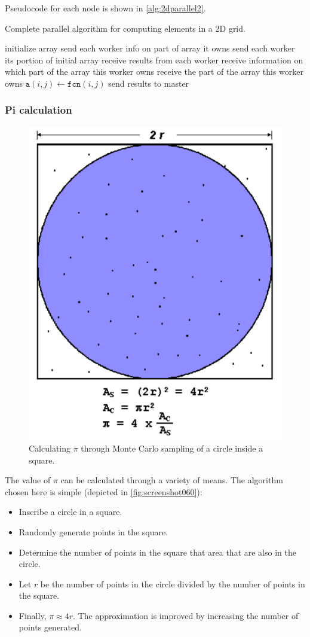 Pseudocode for each node is shown in \autoref{alg:2dparallel2}.
\begin{algorithm}  
\caption{Complete parallel algorithm for computing elements in a 2D grid.}
\label{alg:2dparallel2}
\begin{algorithmic}
	\State initialize array
	\State send each worker info on part of array it owns  
	\State send each worker its portion of initial array  
	\State receive results from each worker
\Else
	\State receive information on which part of the array this worker owns
	\State receive the part of the array this worker owns
			\State $\mathtt{a}(i,j) \gets \mathtt{fcn}(i,j)$
		\EndFor
	\EndFor
	\State send results to master
\EndIf
\end{algorithmic}
\end{algorithm}

\subsubsection{Pi calculation}
\begin{figure}
\centering
\includegraphics[width=0.4\linewidth]{screenshot060}
\caption{Calculating $\pi$ through Monte Carlo sampling of a circle inside a square.}
\label{fig:screenshot060}
\end{figure}
The value of $\pi$ can be calculated through a variety of means. The algorithm chosen here is simple (depicted in \autoref{fig:screenshot060}): \begin{itemize}
\item Inscribe a circle in a square.
\item Randomly generate points in the square.
\item Determine the number of points in the square that area that are also in the circle.
\item Let $r$ be the number of points in the circle divided by the number of points in the square.
\item Finally, $\pi \approx 4r$. The approximation is improved by increasing the number of points generated.
\end{itemize}

